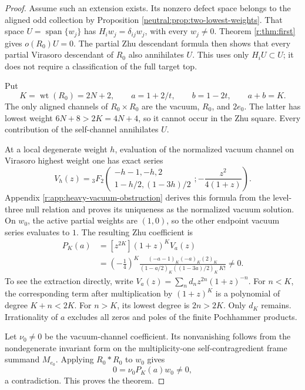 \documentclass[11pt,a4paper]{article}
\numberwithin{equation}{section}
\theoremstyle{definition}\newtheorem{definition}[theorem]{Definition}
\theoremstyle{remark}\newtheorem{remark}[theorem]{Remark}
\newcommand{\wt}{\operatorname{wt}}\newcommand{\loc}{\mathrm{loc}}
\begin{document}
\begin{proof}
Assume such an extension exists. Its nonzero defect space
belongs to the aligned odd collection by
Proposition \ref{neutral:prop:two-lowest-weights}. That space
\(U=\operatorname{span}\{w_j\}\) has
\(H_iw_j=\delta_{ij}w_j\), with every \(w_j\ne0\).
Theorem \ref{r:thm:first} gives \(o(R_0)U=0\).
The partial Zhu descendant formula then shows that every
partial Virasoro descendant of \(R_0\) also annihilates \(U\).
This uses only \(H_iU\subset U\); it does not require a
classification of the full target top.

Put
\[
 K=\wt(R_0)=2N+2,\qquad a=1+2/t,\qquad b=1-2t,
 \qquad a+b=K.
\]
The only aligned channels of \(R_0\times R_0\) are the
vacuum, \(R_0\), and \(2e_0\). The latter has lowest weight
\(6N+8>2K=4N+4\), so it cannot occur in the Zhu square.
Every contribution of the self-channel annihilates \(U\).

At a local degenerate weight \(h\), evaluation of the normalized
vacuum channel on Virasoro highest weight one has exact series
\[
 V_h(z)={}_3F_2\!\left(
 \begin{matrix}-h-1,-h,2\\1-h/2,(1-3h)/2\end{matrix};
 -\frac{z^2}{4(1+z)}\right).
\]
Appendix \ref{r:app:heavy-vacuum-obstruction} derives this formula
from the level-three null relation and proves its uniqueness
as the normalized vacuum solution. On \(w_0\), the active
partial weights are \((1,0)\), so the other endpoint vacuum
series evaluates to \(1\). The resulting Zhu coefficient is
\begin{equation}\label{r:eq:finalnonzero}
 \begin{split}
 P_K(a)&=[z^{2K}](1+z)^K V_a(z)\\
 &=\left(-\frac14\right)^K
 \frac{(-a-1)_K(-a)_K(2)_K}
 {(1-a/2)_K((1-3a)/2)_K\,K!}\ne0.
 \end{split}
\end{equation}
To see the extraction directly, write
\(V_a(z)=\sum_nd_nz^{2n}(1+z)^{-n}\).
For \(n<K\), the corresponding term after multiplication
by \((1+z)^K\) is a polynomial of degree \(K+n<2K\).
For \(n>K\), its lowest degree is \(2n>2K\).
Only \(d_K\) remains. Irrationality of \(a\) excludes all
zeros and poles of the finite Pochhammer products.

Let \(\nu_0\ne0\) be the vacuum-channel coefficient. Its
nonvanishing follows from the nondegenerate invariant form on the
multiplicity-one self-contragredient frame summand \(M_{e_0}\).
Applying \(R_0*R_0\) to \(w_0\) gives
\[
              0=\nu_0P_K(a)w_0\ne0,
\]
a contradiction. This proves the theorem.
\end{proof}
\end{document}
